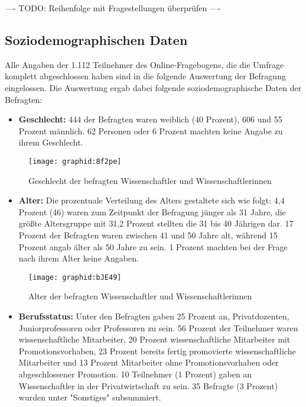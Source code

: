 ---- TODO: Reihenfolge mit Fragestellungen überprüfen ----

\subsection{Soziodemographischen Daten}

Alle Angaben der 1.112 Teilnehmer des Online-Fragebogens, die die Umfrage komplett abgeschlossen haben sind in die folgende Auswertung der Befragung eingelossen. Die Auswertung ergab dabei folgende soziodemographische Daten der Befragten:

\begin{itemize}
\item \textbf{Geschlecht:} 444 der Befragten waren weiblich (40 Prozent), 606 und 55 Prozent männlich. 62 Personen oder 6 Prozent machten keine Angabe zu ihrem Geschlecht.
\end{itemize}

\begin{figure}[h!]
\texttt{[image: graphid:8f2pe]}
\caption{Geschlecht der befragten Wissenschaftler und Wissenschaftlerinnen}
\end{figure}

\begin{itemize}
\item \textbf{Alter:} Die prozentuale Verteilung des Alters gestaltete sich wie folgt: 4,4 Prozent (46) waren zum Zeitpunkt der Befragung jünger als 31 Jahre, die größte Altersgruppe mit 31,2 Prozent stellten die 31 bis 40 Jährigen dar. 17 Prozent der Befragten waren zwischen 41 und 50 Jahre alt, während 15 Prozent angab älter als 50 Jahre zu sein. 1 Prozent machten bei der Frage nach ihrem Alter keine Angaben.
\end{itemize}

\begin{figure}[h!]
\texttt{[image: graphid:bJE49]}
\caption{Alter der befragten Wissenschaftler und Wissenschaftlerinnen}
\end{figure}

\begin{itemize}
\item \textbf{Berufsstatus:} Unter den Befragten gaben 25 Prozent an, Privatdozenten, Juniorprofessoren oder Professoren zu sein. 56 Prozent der Teilnehmer waren wissenschaftliche Mitarbeiter, 20 Prozent wissenschaftliche Mitarbeiter mit Promotionsvorhaben, 23 Prozent bereits fertig promovierte wissenschaftliche Mitarbeiter und 13 Prozent Mitarbeiter ohne Promotionsvorhaben oder abgeschlossener Promotion. 10 Teilnehmer (1 Prozent) gaben an Wissenschaftler in der Privatwirtschaft zu sein. 35 Befragte (3 Prozent) wurden unter "Sonstiges" subsummiert.
\end{itemize}

